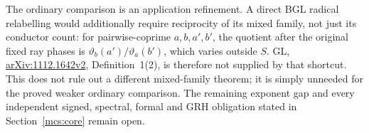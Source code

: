 The ordinary comparison is an application refinement. A direct BGL
radical relabelling would additionally require reciprocity of its mixed
family, not just its conductor count: for pairwise-coprime $a,b,a',b'$,
the quotient after the original fixed ray phases is
$\vartheta_b(a')/\vartheta_a(b')$, which varies outside $S$.
GL, \href{https://arxiv.org/pdf/1112.1642v2}{arXiv:1112.1642v2},
Definition~1(2), is therefore not supplied by that shortcut.
This does not rule out a different mixed-family theorem; it is simply
unneeded for the proved weaker ordinary comparison.
The remaining exponent gap and every independent signed, spectral,
formal and GRH obligation stated in Section~\ref{mcs:core} remain open.
